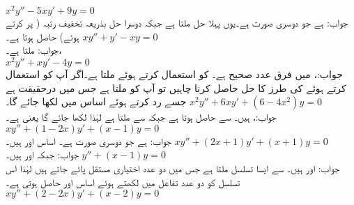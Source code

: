 \quad
$x^2y''-5xy'+9y=0$\\
جواب: ہے جو دوسری صورت ہے۔یوں پہلا حل   ملتا ہے جبکہ دوسرا حل بذریعہ تخفیف رتبہ ( پر کرتے ہوئے)  حاصل ہوتا ہے۔ 
\quad
$xy''+y'-xy=0$\\
جواب: ملتا ہے۔، \\
\quad
$x^2y''+xy'-4y=0$\\
جواب:،  میں فرق عدد صحیح ہے۔ کو استعمال کرتے ہوئے  ملتا ہے۔اگر آپ  کو استعمال کرتے ہوئے   کی طرز کا حل حاصل کرنا چاہیں تو آپ کو  ملتا ہے جس میں  درحقیقت  ہے جسے رد کرتے ہوئے اساس میں  لکھا جائے گا۔  
\quad
$x^2y''+6xy'+(6-4x^2)y=0$\\
جواب:،  ہیں۔  سے   حاصل ہوتا ہے جبکہ  سے  ملتا ہے لہٰذا  لکھا جائے گا یعنی  ہے۔
\quad
$xy''+(1-2x)y'+(x-1)y=0$\\
جواب: ہے جو دوسری صورت ہے۔ اساس  اور  ہیں۔
\quad
$xy''+(2x+1)y'+(x+1)y=0$\\
جواب: جبکہ  اور  ہیں۔
\quad 
$y''+(x-1)y=0$\\
جواب: اور  ہیں۔  سے ایسا تسلسل ملتا ہے جس میں دو عدد اختیاری مستقل پائے جاتے ہیں لہٰذا اس تسلسل کو دو عدد تفاعل میں لکھتے ہوئے اساس  اور 
 حاصل ہوتی ہے۔
\quad
$xy''+(2-2x)y'+(x-2)y=0$\\
